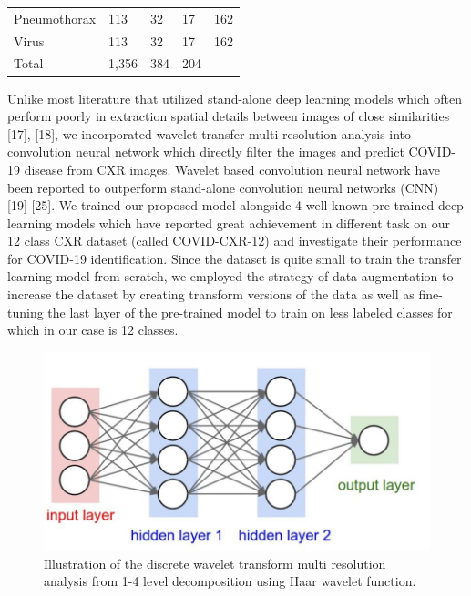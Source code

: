 \documentclass{standalone}
\begin{document}
\begin{table}[]
\begin{tabular}{lllll}
Pneumothorax                  & 113                               & 32                                  & 17                            & 162                        \\
Virus                         & 113                               & 32                                  & 17                            & 162                        \\ \hline
\multicolumn{1}{l}{Total}   & \multicolumn{1}{l}{1,356}        & \multicolumn{1}{l}{384}            & \multicolumn{1}{l}{204}      & \multicolumn{1}{l}{}      \\ \hline 
\bottomrule
\end{tabular}
\label{tab1}
\end{table}

Unlike most literature that utilized stand-alone deep learning models which often perform poorly in extraction spatial details between images of close similarities [17], [18], we incorporated wavelet transfer multi resolution analysis into convolution neural network which directly filter the images and predict COVID-19 disease from CXR images. Wavelet based convolution neural network have been reported to outperform stand-alone convolution neural networks (CNN) [19]-[25]. We trained our proposed model alongside 4 well-known pre-trained deep learning models which have reported great achievement in different task on our 12 class CXR dataset (called COVID-CXR-12) and investigate their performance for COVID-19 identification. Since the dataset is quite small to train the transfer learning model from scratch, we employed the strategy of data augmentation to increase the dataset by creating transform versions of the data as well as fine-tuning the last layer of the pre-trained model to train on less labeled classes for which in our case is 12 classes. 

\begin{figure}[t!]
\centering
\includegraphics[scale=0.4]{pic/C3/c3_p1-3}
\caption{Illustration of  the discrete wavelet transform multi resolution analysis from 1-4 level decomposition using Haar wavelet function.}
\label{fig:c3_p1-3}
\end{figure}
\end{document}
